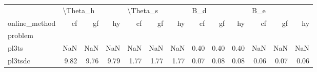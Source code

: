 \begin{tabular}{lrrrrrrrrrrrr}
\toprule
{} & \multicolumn{3}{l}{\textbackslash Theta\_h} & \multicolumn{3}{l}{\textbackslash Theta\_s} & \multicolumn{3}{l}{B\_d} & \multicolumn{3}{l}{B\_e} \\
online\_method &       cf &   gf &   hy &       cf &   gf &   hy &   cf &   gf &   hy &   cf &   gf &   hy \\
problem &          &      &      &          &      &      &      &      &      &      &      &      \\
\midrule
pl3ts   &      NaN &  NaN &  NaN &      NaN &  NaN &  NaN & 0.40 & 0.40 & 0.40 &  NaN &  NaN &  NaN \\
pl3tsdc &     9.82 & 9.76 & 9.79 &     1.77 & 1.77 & 1.77 & 0.07 & 0.08 & 0.08 & 0.06 & 0.07 & 0.06 \\
\bottomrule
\end{tabular}
